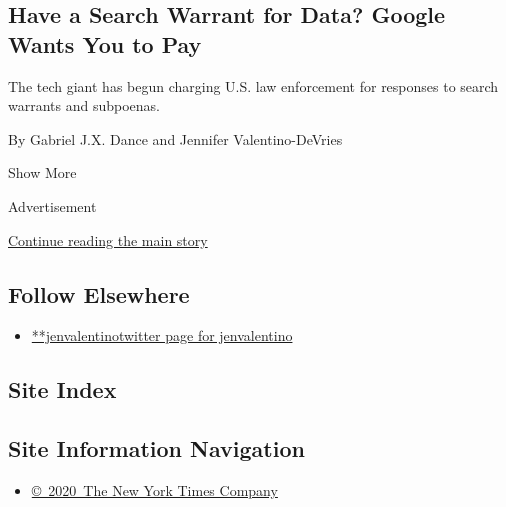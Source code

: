 \begin{enumerate}
  \hypertarget{have-a-search-warrant-for-data-google-wants-you-to-pay}{%
  \subsection{Have a Search Warrant for Data? Google Wants You to
  Pay}\label{have-a-search-warrant-for-data-google-wants-you-to-pay}}

  The tech giant has begun charging U.S. law enforcement for responses
  to search warrants and subpoenas.

  By Gabriel J.X. Dance and Jennifer Valentino-DeVries
\end{enumerate}

Show More

Advertisement

\protect\hyperlink{after-mid2}{Continue reading the main story}

\hypertarget{follow-elsewhere}{%
\subsection{Follow Elsewhere}\label{follow-elsewhere}}

\begin{itemize}
\tightlist
\item
  \href{https://twitter.com/jenvalentino}{**jenvalentinotwitter page for
  jenvalentino}
\end{itemize}

\hypertarget{site-index}{%
\subsection{Site Index}\label{site-index}}

\hypertarget{site-information-navigation}{%
\subsection{Site Information
Navigation}\label{site-information-navigation}}

\begin{itemize}
\tightlist
\item
  \href{https://help.nytimes3xbfgragh.onion/hc/en-us/articles/115014792127-Copyright-notice}{©~2020~The
  New York Times Company}
\end{itemize}


